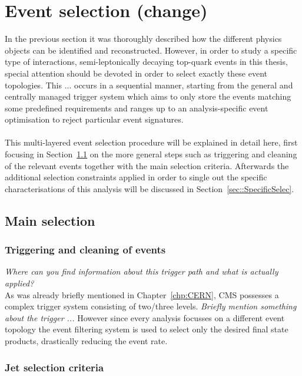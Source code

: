 \chapter{Event selection (change)} \label{chp:labelTitle}

In the previous section it was thoroughly described how the different physics objects can be identified and reconstructed.
However, in order to study a specific type of interactions, semi-leptonically decaying top-quark events in this thesis, special attention should be devoted in order to select exactly these event topologies.
This ... occurs in a sequential manner, starting from the general and centrally managed trigger system which aims to only store the events matching some predefined requirements and ranges up to an analysis-specific event optimisation to reject particular event signatures.
\\
\\
This multi-layered event selection procedure will be explained in detail here, first focusing in Section~\ref{sec::MainSelec} on the more general steps such as triggering and cleaning of the relevant events together with the main selection criteria.
Afterwards the additional selection constraints applied in order to single out the specific characterisations of this analysis will be discussed in Section~\ref{sec::SpecificSelec}.

\section{Main selection}\label{sec::MainSelec}

\subsection{Triggering and cleaning of events}\label{subsec::Trigger}
\textit{Where can you find information about this trigger path and what is actually applied?}\\
As was already briefly mentioned in Chapter~\ref{chp:CERN}, CMS possesses a complex trigger system consisting of two/three levels.
\textit{Briefly mention something about the trigger ...}
However since every analysis focusses on a different event topology the event filtering system is used to select only the desired final state products, drastically reducing the event rate.

\subsection{Jet selection criteria}

